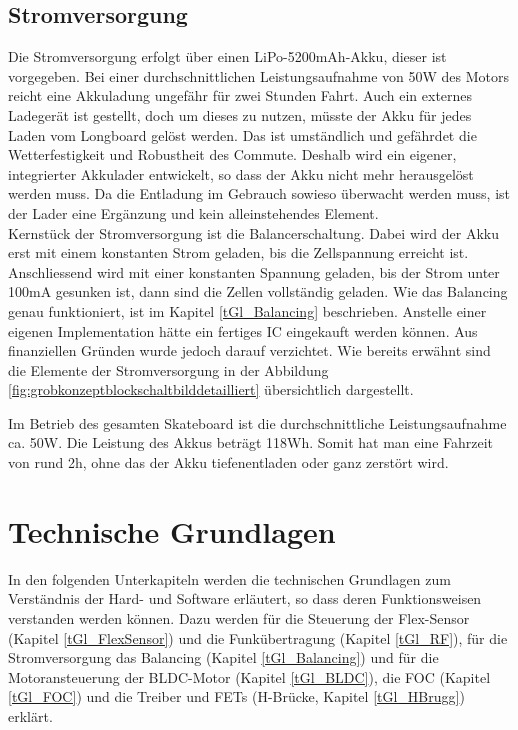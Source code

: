\subsection*{Stromversorgung}
Die Stromversorgung erfolgt über einen LiPo-5200mAh-Akku, dieser ist vorgegeben. Bei einer durchschnittlichen Leistungsaufnahme von 50W des Motors reicht eine Akkuladung ungefähr für zwei Stunden Fahrt. Auch ein externes Ladegerät ist gestellt, doch um dieses zu nutzen, müsste der Akku für jedes Laden vom Longboard gelöst werden. Das ist umständlich und gefährdet die Wetterfestigkeit und Robustheit des Commute. Deshalb wird ein eigener, integrierter Akkulader entwickelt, so dass der Akku nicht mehr herausgelöst werden muss. Da die Entladung im Gebrauch sowieso überwacht werden muss, ist der Lader eine Ergänzung und kein alleinstehendes Element. \\ Kernstück der Stromversorgung ist die Balancerschaltung. Dabei wird der Akku erst mit einem konstanten Strom geladen, bis die Zellspannung erreicht ist. Anschliessend wird mit einer konstanten Spannung geladen, bis der Strom unter 100mA gesunken ist, dann sind die Zellen vollständig geladen. Wie das Balancing genau funktioniert, ist im Kapitel \ref{tGl_Balancing} beschrieben. Anstelle einer eigenen Implementation hätte ein fertiges IC eingekauft werden können. Aus finanziellen Gründen wurde jedoch darauf verzichtet. Wie bereits erwähnt sind die Elemente der Stromversorgung in der Abbildung \ref{fig:grobkonzeptblockschaltbilddetailliert} übersichtlich dargestellt.


Im Betrieb des gesamten Skateboard ist die durchschnittliche Leistungsaufnahme ca. 50W. Die Leistung des Akkus beträgt 118Wh. Somit hat man eine Fahrzeit von rund 2h, ohne das der Akku tiefenentladen oder ganz zerstört wird.

\section{Technische Grundlagen}
In den folgenden Unterkapiteln werden die technischen Grundlagen zum Verständnis der Hard- und Software erläutert, so dass deren Funktionsweisen verstanden werden können.  Dazu werden für die Steuerung der Flex-Sensor (Kapitel \ref{tGl_FlexSensor}) und die Funkübertragung (Kapitel \ref{tGl_RF}), für die Stromversorgung das Balancing (Kapitel \ref{tGl_Balancing}) und für die Motoransteuerung der BLDC-Motor (Kapitel \ref{tGl_BLDC}), die FOC (Kapitel \ref{tGl_FOC}) und die Treiber und FETs (H-Brücke, Kapitel \ref{tGl_HBrugg}) erklärt.

